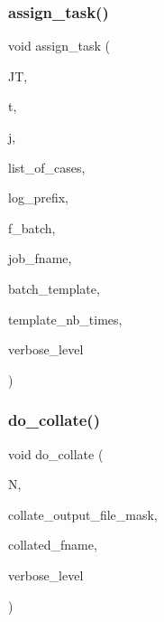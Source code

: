 \subsubsection{\texorpdfstring{assign\+\_\+task()}{assign\_task()}}
{\footnotesize\ttfamily void assign\+\_\+task (\begin{DoxyParamCaption}\item[{\mbox{\hyperlink{classjob__table}{job\+\_\+table}} $\ast$}]{JT,  }\item[{\mbox{\hyperlink{galois_8h_a09fddde158a3a20bd2dcadb609de11dc}{I\+NT}}}]{t,  }\item[{\mbox{\hyperlink{galois_8h_a09fddde158a3a20bd2dcadb609de11dc}{I\+NT}}}]{j,  }\item[{\mbox{\hyperlink{galois_8h_a09fddde158a3a20bd2dcadb609de11dc}{I\+NT}} $\ast$}]{list\+\_\+of\+\_\+cases,  }\item[{const \mbox{\hyperlink{galois_8h_ab6cc7b4aeb6ea31aba2b3fbfc83ff5e6}{B\+Y\+TE}} $\ast$}]{log\+\_\+prefix,  }\item[{\mbox{\hyperlink{galois_8h_a09fddde158a3a20bd2dcadb609de11dc}{I\+NT}}}]{f\+\_\+batch,  }\item[{const \mbox{\hyperlink{galois_8h_ab6cc7b4aeb6ea31aba2b3fbfc83ff5e6}{B\+Y\+TE}} $\ast$}]{job\+\_\+fname,  }\item[{const \mbox{\hyperlink{galois_8h_ab6cc7b4aeb6ea31aba2b3fbfc83ff5e6}{B\+Y\+TE}} $\ast$}]{batch\+\_\+template,  }\item[{\mbox{\hyperlink{galois_8h_a09fddde158a3a20bd2dcadb609de11dc}{I\+NT}}}]{template\+\_\+nb\+\_\+times,  }\item[{\mbox{\hyperlink{galois_8h_a09fddde158a3a20bd2dcadb609de11dc}{I\+NT}}}]{verbose\+\_\+level }\end{DoxyParamCaption})}

\mbox{\label{scheduler_8_c_a25c4e69df3d752c2cee61cc00db89a9c}} 
\subsubsection{\texorpdfstring{do\+\_\+collate()}{do\_collate()}}
{\footnotesize\ttfamily void do\+\_\+collate (\begin{DoxyParamCaption}\item[{\mbox{\hyperlink{galois_8h_a09fddde158a3a20bd2dcadb609de11dc}{I\+NT}}}]{N,  }\item[{const \mbox{\hyperlink{galois_8h_ab6cc7b4aeb6ea31aba2b3fbfc83ff5e6}{B\+Y\+TE}} $\ast$}]{collate\+\_\+output\+\_\+file\+\_\+mask,  }\item[{const \mbox{\hyperlink{galois_8h_ab6cc7b4aeb6ea31aba2b3fbfc83ff5e6}{B\+Y\+TE}} $\ast$}]{collated\+\_\+fname,  }\item[{\mbox{\hyperlink{galois_8h_a09fddde158a3a20bd2dcadb609de11dc}{I\+NT}}}]{verbose\+\_\+level }\end{DoxyParamCaption})}

